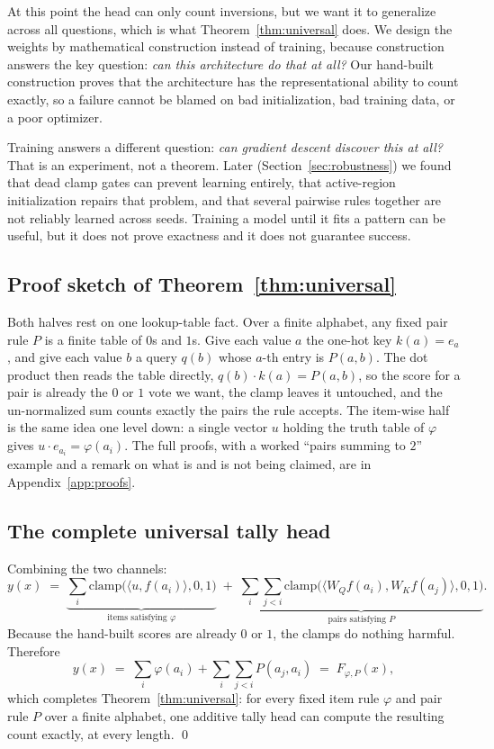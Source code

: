 \documentclass[10pt]{article}
\theoremstyle{definition}
\newcommand{\clampf}{\mathrm{clamp}}
\begin{document}
At this point the head can only count inversions, but we want it to
generalize across all questions, which is what
Theorem~\ref{thm:universal} does. We design the weights by mathematical
construction instead of training, because construction answers the key
question: \emph{can this architecture do that at all?} Our hand-built
construction proves that the architecture has the representational ability
to count exactly, so a failure cannot be blamed on bad initialization, bad
training data, or a poor optimizer.

Training answers a different question: \emph{can gradient descent discover
this at all?} That is an experiment, not a theorem. Later
(Section~\ref{sec:robustness}) we found that dead clamp gates can prevent
learning entirely, that active-region initialization repairs that problem,
and that several pairwise rules together are not reliably learned across
seeds. Training a model until it fits a pattern can be useful, but it does not
prove exactness and it does not guarantee success.

\subsection{Proof sketch of Theorem~\ref{thm:universal}}
\label{sec:proof-sketch}

Both halves rest on one lookup-table fact. Over a finite alphabet, any
fixed pair rule $P$ is a finite table of $0$s and $1$s. Give each value $a$
the one-hot key $k(a) = e_a$, and give each value $b$ a query $q(b)$ whose
$a$-th entry is $P(a, b)$. The dot product then reads the table directly,
$q(b) \cdot k(a) = P(a, b)$, so the score for a pair is already the $0$ or
$1$ vote we want, the clamp leaves it untouched, and the un-normalized sum
counts exactly the pairs the rule accepts. The item-wise half is the same
idea one level down: a single vector $u$ holding the truth table of
$\varphi$ gives $u \cdot e_{a_i} = \varphi(a_i)$. The full proofs, with a
worked ``pairs summing to $2$'' example and a remark on what is and is not
being claimed, are in Appendix~\ref{app:proofs}.

\subsection{The complete universal tally head}
\label{sec:universal-head}
\label{sec:complete}

Combining the two channels:
\begin{equation}
y(x) \;=\;
\underbrace{\sum_i \clampf\big(\langle u, f(a_i)\rangle, 0, 1\big)}_{\text{items satisfying } \varphi}
\;+\;
\underbrace{\sum_i \sum_{j<i} \clampf\big(\langle W_Q f(a_i), W_K f(a_j)\rangle, 0, 1\big)}_{\text{pairs satisfying } P}.
\label{eq:complete}
\end{equation}
Because the hand-built scores are already $0$ or $1$, the clamps do
nothing harmful. Therefore
\[
y(x) \;=\; \sum_i \varphi(a_i) + \sum_i\sum_{j<i} P(a_j, a_i) \;=\; F_{\varphi,P}(x),
\]
which completes Theorem~\ref{thm:universal}: for every fixed item rule
$\varphi$ and pair rule $P$ over a finite alphabet, one additive tally
head can compute the resulting count exactly, at every length. \qed
\end{document}
